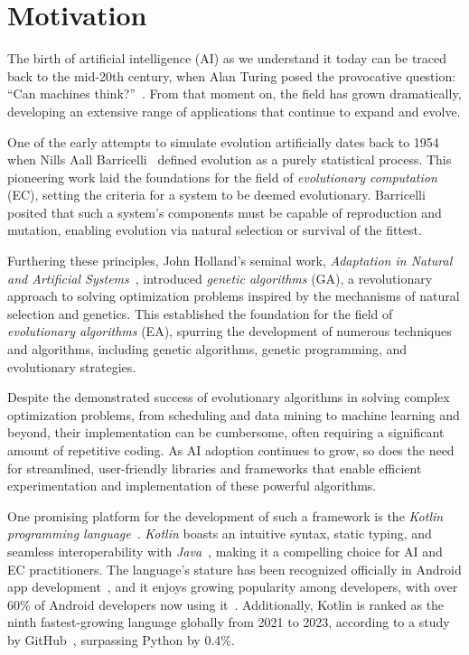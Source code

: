 \section{Motivation}
\label{sec:motivation}
  The birth of artificial intelligence (AI) as we understand it today can be
  traced back to the mid-20th century, when Alan Turing posed the provocative
  question: \enquote{Can machines
  think?}~\autocite{turingCOMPUTINGMACHINERYINTELLIGENCE1950a}.
  From that moment on, the field has grown dramatically, developing an
  extensive range of applications that continue to expand and evolve.

  One of the early attempts to simulate evolution artificially dates back to
  1954 when Nills Aall
  Barricelli~\autocite{barricelliNumericalTestingEvolution1962} defined
  evolution as a purely statistical process.
  This pioneering work laid the foundations for the field of
  \emph{evolutionary computation} (EC), setting the criteria for a system to
  be deemed evolutionary.
  Barricelli posited that such a system's components must be capable of
  reproduction and mutation, enabling evolution via natural selection or
  survival of the fittest.

  Furthering these principles, John Holland's seminal work, \emph{Adaptation
  in Natural and Artificial
  Systems}~\autocite{hollandAdaptationNaturalArtificial1992a}, introduced
  \emph{genetic algorithms} (GA), a revolutionary approach to solving
  optimization problems inspired by the mechanisms of natural selection and
  genetics.
  This established the foundation for the field of \emph{evolutionary
  algorithms} (EA), spurring the development of numerous techniques and
  algorithms, including genetic algorithms, genetic programming, and
  evolutionary strategies.

  Despite the demonstrated success of evolutionary algorithms in solving
  complex optimization problems, from scheduling and data mining to machine
  learning and beyond, their implementation can be cumbersome, often requiring
  a significant amount of repetitive coding.
  As AI adoption continues to grow, so does the need for streamlined,
  user-friendly libraries and frameworks that enable efficient experimentation
  and implementation of these powerful algorithms.

  One promising platform for the development of such a framework is the
  \emph{Kotlin programming language}~\autocite{KotlinProgrammingLanguagea}.
  \textit{Kotlin} boasts an intuitive syntax, static typing, and seamless
  interoperability with
  \textit{Java}~\autocite{CallingJavaKotlin,CallingKotlinJava,KotlinJavaInteropGuide},
  making it a compelling choice for AI and EC practitioners.
  The language's stature has been recognized officially in Android app
  development~\autocite{AndroidKotlinfirstApproach}, and it enjoys growing
  popularity among developers, with over 60\% of Android developers now using
  it~\autocite{LatestProgrammingLanguages2023}.
  Additionally, Kotlin is ranked as the ninth fastest-growing language
  globally from 2021 to 2023, according to a study by
  GitHub~\autocite{TopProgrammingLanguages}, surpassing Python by 0.4\%.

